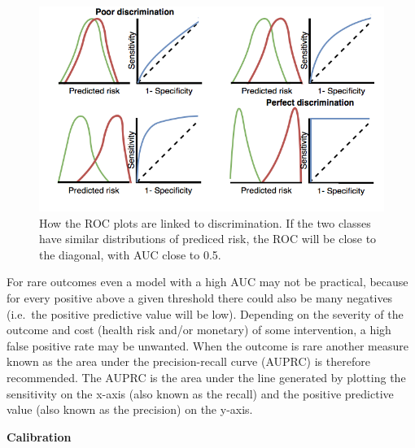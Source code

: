 \documentclass[11pt]{book}
\theoremstyle{definition}
\theoremstyle{definition}
\theoremstyle{definition}
\theoremstyle{remark}
\begin{document}
\begin{figure}
\includegraphics[width=1\linewidth]{images/PatientLevelPrediction/theory/roctheory} \caption{How the ROC plots are linked to discrimination. If the two classes have similar distributions of prediced risk, the ROC will be close to the diagonal, with AUC close to 0.5.}\label{fig:figuretheoryroctheory}
\end{figure}

For rare outcomes even a model with a high AUC may not be practical, because for every positive above a given threshold there could also be many negatives (i.e.~the positive predictive value will be low). Depending on the severity of the outcome and cost (health risk and/or monetary) of some intervention, a high false positive rate may be unwanted. When the outcome is rare another measure known as the area under the precision-recall curve (AUPRC) is therefore recommended. The AUPRC is the area under the line generated by plotting the sensitivity on the x-axis (also known as the recall) and the positive predictive value (also known as the precision) on the y-axis. 

\textbf{Calibration}
\end{document}
